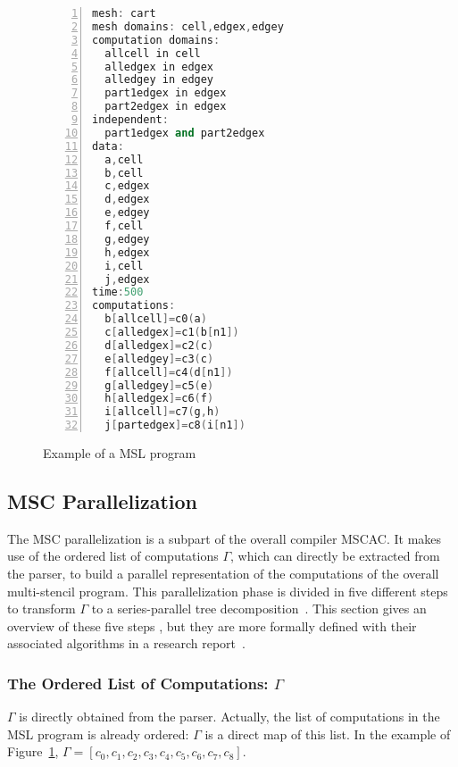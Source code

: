 \begin{figure}[t]
\begin{lstlisting}[basicstyle=\small,mathescape,frame=single,language=C++,numbers=left]
mesh: cart
mesh domains: cell,edgex,edgey
computation domains:
  allcell in cell
  alledgex in edgex
  alledgey in edgey
  part1edgex in edgex
  part2edgex in edgex
independent:
  part1edgex and part2edgex
data:
  a,cell
  b,cell
  c,edgex
  d,edgex
  e,edgey
  f,cell
  g,edgey
  h,edgex
  i,cell
  j,edgex
time:500
computations:
  b[allcell]=c0(a)
  c[alledgex]=c1(b[n1])
  d[alledgex]=c2(c)
  e[alledgey]=c3(c)
  f[allcell]=c4(d[n1])
  g[alledgey]=c5(e)
  h[alledgex]=c6(f)
  i[allcell]=c7(g,h)
  j[partedgex]=c8(i[n1])
\end{lstlisting}
\caption{Example of a MSL program}
\label{fig:mslex}
\end{figure}

\subsection{MSC Parallelization}
The MSC parallelization is a subpart of the overall compiler MSCAC.
It makes use of the ordered list of computations $\Gamma$, which can directly be extracted from the parser, to build a parallel representation of the computations of the overall multi-stencil program.
This parallelization phase is divided in five different steps to transform $\Gamma$ to a series-parallel tree decomposition~\cite{Valdes:1979:RSP:800135.804393}.
This section gives an overview of these five steps , but they are more formally defined with their associated algorithms in a research report~\cite{????}.

\subsubsection*{The Ordered List of Computations: $\Gamma$}
$\Gamma$ is directly obtained from the parser. Actually, the list of computations in the MSL program is already ordered: $\Gamma$ is a direct map of this list. In the example of Figure~\ref{fig:mslex}, $\Gamma = [c_0,c_1,c_2,c_3,c_4,c_5,c_6,c_7,c_8]$.

